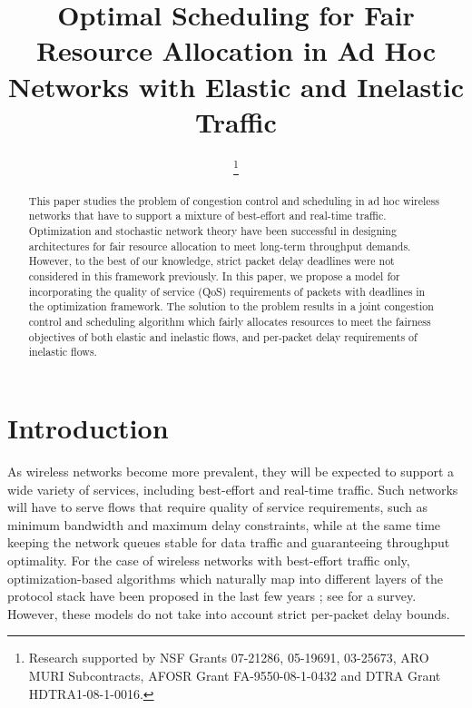 \documentclass[conference]{IEEEtran}
\begin{document}
\title{Optimal Scheduling for Fair Resource Allocation in Ad Hoc Networks with Elastic and Inelastic Traffic}
\author{
	\and
	\thanks{Research supported by NSF Grants 07-21286, 05-19691, 03-25673, ARO MURI Subcontracts, AFOSR Grant FA-9550-08-1-0432 and DTRA Grant HDTRA1-08-1-0016.}
}
\maketitle

\begin{abstract}

This paper studies the problem of congestion control and scheduling in ad hoc wireless networks that have to support a mixture of best-effort and real-time traffic. Optimization and stochastic network theory have been successful in designing architectures for fair resource allocation to meet long-term throughput demands. However, to the best of our knowledge, strict packet delay deadlines were not considered in this framework previously. In this paper, we propose a model for incorporating the quality of service (QoS) requirements of packets with deadlines  in the optimization framework. The solution to the problem results in a joint congestion control and scheduling algorithm which fairly allocates resources to meet the fairness objectives of both elastic and inelastic flows, and per-packet delay requirements of inelastic flows.

\end{abstract}
\section{Introduction}

As wireless networks become more prevalent, they will be expected to support a wide variety of services, including best-effort and real-time traffic. Such networks will have to serve flows that require quality of service requirements, such as minimum bandwidth and maximum delay constraints, while at the same time keeping the network queues stable for data traffic and guaranteeing throughput optimality. For the case of wireless networks with best-effort traffic only, optimization-based algorithms  which naturally map into different layers of the protocol stack have been proposed in the last few years \cite{Eryilmaz05, Lin04, Neely05, Stolyar05, Eryilmaz06, Chen06}; see \cite{Lin06} for a survey. However, these models do not take into account strict per-packet delay bounds.
\end{document}
